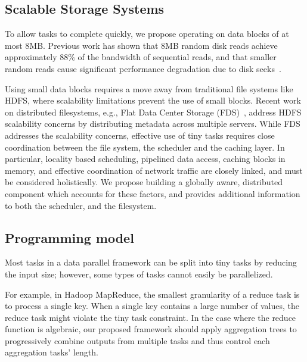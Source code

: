 \subsection{Scalable Storage Systems}
To allow tasks to complete quickly, we propose operating on data blocks of
at most $8$MB. Previous work has shown that $8$MB random disk reads achieve
approximately $88$\% of the bandwidth of sequential reads, and that smaller random
reads cause significant performance degradation due to disk
seeks~\cite{nightingale2012flat}. 

Using small data blocks requires a move away from traditional file systems like
HDFS, where scalability limitations prevent the use of small blocks.
Recent work on distributed filesystems, e.g., Flat Data Center
Storage (FDS)~\cite{nightingale2012flat}, address HDFS scalability concerns by
distributing metadata across multiple servers. While FDS addresses the scalability
concerns, effective use of tiny tasks requires close coordination between the file
system, the scheduler and the caching layer.
In particular, locality based scheduling, pipelined data access, caching blocks in 
memory, and effective coordination of network traffic are closely linked, and 
must be considered holistically. We propose building a globally aware, distributed
component which accounts for these factors, and provides additional information to
both the scheduler, and the filesystem.

\subsection{Programming model}
\label{sec:prog}
Most tasks in a data parallel framework can be split into tiny tasks by
reducing the input size; however, some types of tasks cannot easily be
parallelized.

For example, in Hadoop MapReduce, the smallest granularity of a reduce task
is to process a single key.
When a single key contains a large number of values, the reduce task might
violate the tiny task constraint.
In the case where the reduce function is algebraic, our proposed framework should
apply aggregation trees to progressively combine outputs from multiple tasks and
thus control each aggregation tasks' length.



